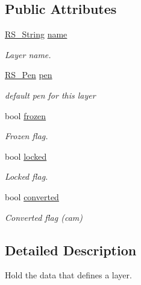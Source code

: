 \subsection*{Public Attributes}
\begin{DoxyCompactItemize}
\item 
\hyperlink{rs__string_8h_a5adec11f318c2ae2ecdc6fe2b03be9fa}{R\-S\-\_\-\-String} \hyperlink{class_r_s___layer_data_a1498ff898dacc250220f3335a1846f94}{name}
\begin{DoxyCompactList}\small\item\em Layer name. \end{DoxyCompactList}\item 
\hyperlink{class_r_s___pen}{R\-S\-\_\-\-Pen} \hyperlink{class_r_s___layer_data_af48b45bd16d5049c5cf119937e3431dc}{pen}
\begin{DoxyCompactList}\small\item\em default pen for this layer \end{DoxyCompactList}\item 
bool \hyperlink{class_r_s___layer_data_ad8354948505fd761a0adc5139583e5f5}{frozen}
\begin{DoxyCompactList}\small\item\em Frozen flag. \end{DoxyCompactList}\item 
bool \hyperlink{class_r_s___layer_data_a494d27995246b1865aabda3ce5e90974}{locked}
\begin{DoxyCompactList}\small\item\em Locked flag. \end{DoxyCompactList}\item 
bool \hyperlink{class_r_s___layer_data_aaa6412d010448096fa531e493cd2a54a}{converted}
\begin{DoxyCompactList}\small\item\em Converted flag (cam) \end{DoxyCompactList}\end{DoxyCompactItemize}


\subsection{Detailed Description}
Hold the data that defines a layer. 

